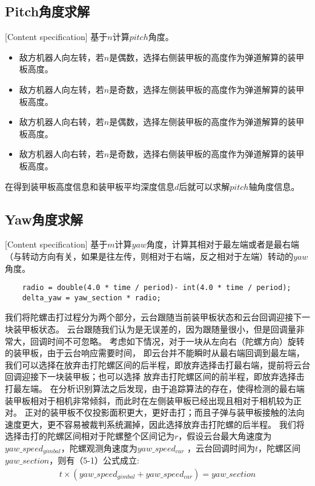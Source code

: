 \subsection{Pitch角度求解}[Content specification]
基于$n$计算$pitch$角度。
\begin{itemize}[itemindent=2em]
    \item 敌方机器人向左转，若$n$是偶数，选择右侧装甲板的高度作为弹道解算的装甲板高度。
    \item 敌方机器人向左转，若$n$是奇数，选择左侧装甲板的高度作为弹道解算的装甲板高度。
    \item 敌方机器人向右转，若$n$是偶数，选择左侧装甲板的高度作为弹道解算的装甲板高度。
    \item 敌方机器人向右转，若$n$是奇数，选择右侧装甲板的高度作为弹道解算的装甲板高度。
\end{itemize}

在得到装甲板高度信息和装甲板平均深度信息$d$后就可以求解$pitch$轴角度信息。

\subsection{Yaw角度求解}[Content specification]
基于$m$计算$yaw$角度，计算其相对于最左端或者是最右端（与转动方向有关，如果是往左传，则相对于右端，反之相对于左端）转动的$yaw$角度。
\begin{lstlisting}
    radio = double(4.0 * time / period)- int(4.0 * time / period);
    delta_yaw = yaw_section * radio;
\end{lstlisting}

我们将陀螺击打过程分为两个部分，云台跟随当前装甲板状态和云台回调迎接下一块装甲板状态。
云台跟随我们认为是无误差的，因为跟随量很小，但是回调量非常大，回调时间不可忽略。
考虑如下情况，对于一块从左向右（陀螺方向）旋转的装甲板，由于云台响应需要时间，
即云台并不能瞬时从最右端回调到最左端，
我们可以选择在放弃击打陀螺区间的后半程，即放弃选择击打最右端，提前将云台回调迎接下一块装甲板；也可以选择
放弃击打陀螺区间的前半程，即放弃选择击打最左端。
在分析识别算法之后发现，由于追踪算法的存在，使得检测的最右端装甲板相对于相机非常倾斜，而此时在左侧装甲板已经出现且相对于相机较为正对。
正对的装甲板不仅投影面积更大，更好击打；而且子弹与装甲板接触的法向速度更大，更不容易被裁判系统漏掉，因此选择放弃击打陀螺的后半程。
我们将选择击打的陀螺区间相对于陀螺整个区间记为$r$，假设云台最大角速度为$yaw\_speed_{gimbal}$，陀螺观测角速度为$yaw\_speed_{car}$
，云台回调时间为$t$，陀螺区间$yaw\_section$，则有（5-1）公式成立:
\begin{gather}
    t  \times (yaw\_speed_{gimbal} + yaw\_speed_{car}) = yaw\_section \\
\end{gather}

